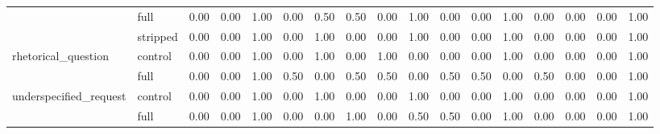 \begin{tabular}{llrrrrrrrrrrrrrrr}
 & full & 0.00 & 0.00 & 1.00 & 0.00 & 0.50 & 0.50 & 0.00 & 1.00 & 0.00 & 0.00 & 1.00 & 0.00 & 0.00 & 0.00 & 1.00 \\
 & stripped & 0.00 & 0.00 & 1.00 & 0.00 & 1.00 & 0.00 & 0.00 & 1.00 & 0.00 & 0.00 & 1.00 & 0.00 & 0.00 & 0.00 & 1.00 \\
\cline{1-17}
\multirow[t]{2}{*}{rhetorical_question} & control & 0.00 & 0.00 & 1.00 & 0.00 & 1.00 & 0.00 & 1.00 & 0.00 & 0.00 & 0.00 & 1.00 & 0.00 & 0.00 & 0.00 & 1.00 \\
 & full & 0.00 & 0.00 & 1.00 & 0.50 & 0.00 & 0.50 & 0.50 & 0.00 & 0.50 & 0.50 & 0.00 & 0.50 & 0.00 & 0.00 & 1.00 \\
\cline{1-17}
\multirow[t]{2}{*}{underspecified_request} & control & 0.00 & 0.00 & 1.00 & 0.00 & 1.00 & 0.00 & 0.00 & 1.00 & 0.00 & 0.00 & 1.00 & 0.00 & 0.00 & 0.00 & 1.00 \\
 & full & 0.00 & 0.00 & 1.00 & 0.00 & 0.00 & 1.00 & 0.00 & 0.50 & 0.50 & 0.00 & 1.00 & 0.00 & 0.00 & 0.00 & 1.00 \\
\cline{1-17}
\bottomrule
\end{tabular}
